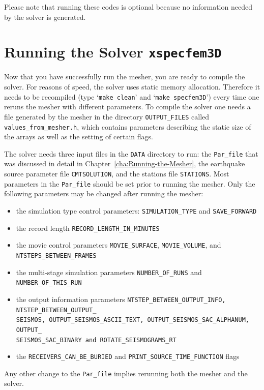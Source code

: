 \documentclass[oneside,english]{book}
\begin{document}
Please note that running these codes is optional because no information
needed by the solver is generated.

\chapter{\label{cha:Running-the-Solver}Running the Solver \texttt{xspecfem3D}}

Now that you have successfully run the mesher, you are ready to compile
the solver. For reasons of speed, the solver uses static memory allocation.
Therefore it needs to be recompiled (type `\texttt{make clean}' and
`\texttt{make specfem3D}') every time one reruns the mesher with different
parameters. To compile the solver one needs a file generated by the
mesher in the directory \texttt{OUTPUT\_FILES} called \texttt{values\_from\_mesher.h},
which contains parameters describing the static size of the arrays
as well as the setting of certain flags.

The solver needs three input files in the \texttt{DATA} directory
to run: the \texttt{Par\_file} that was discussed in detail in Chapter~\ref{cha:Running-the-Mesher},
the earthquake source parameter file \texttt{CMTSOLUTION}, and the
stations file \texttt{STATIONS}. Most parameters in the \texttt{Par\_file}
should be set prior to running the mesher. Only the following parameters
may be changed after running the mesher:

\begin{itemize}
\item the simulation type control parameters: \texttt{SIMULATION\_TYPE}
and \texttt{SAVE\_FORWARD}
\item the record length \texttt{RECORD\_LENGTH\_IN\_MINUTES}
\item the movie control parameters \texttt{MOVIE\_SURFACE}, \texttt{MOVIE\_VOLUME},
and \texttt{NTSTEPS\_BETWEEN\_FRAMES}
\item the multi-stage simulation parameters \texttt{NUMBER\_OF\_RUNS} and
\texttt{NUMBER\_OF\_THIS\_RUN}
\item the output information parameters \texttt{NTSTEP\_BETWEEN\_OUTPUT\_INFO,
NTSTEP\_BETWEEN\_OUTPUT\_}~\\
\texttt{SEISMOS, OUTPUT\_SEISMOS\_ASCII\_TEXT, OUTPUT\_SEISMOS\_SAC\_ALPHANUM,
OUTPUT\_}~\\
\texttt{SEISMOS\_SAC\_BINARY and ROTATE\_SEISMOGRAMS\_RT}
\item the \texttt{RECEIVERS\_CAN\_BE\_BURIED} and \texttt{PRINT\_SOURCE\_TIME\_FUNCTION}
flags
\end{itemize}
Any other change to the \texttt{Par\_file} implies rerunning both
the mesher and the solver.
\end{document}
